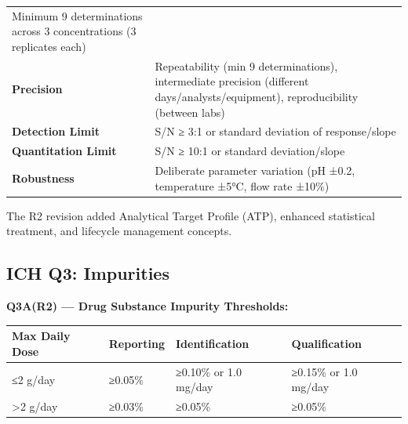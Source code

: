 \documentclass[
  11pt,
  a4paper,
]{report}
\begin{document}
\begin{longtable}[]{@{}ll@{}}
\begin{minipage}[t]{0.51\columnwidth}
Minimum 9 determinations across 3 concentrations (3 replicates
each)\strut
\end{minipage}\tabularnewline
\begin{minipage}[t]{0.43\columnwidth}\raggedright
\textbf{Precision}\strut
\end{minipage} & \begin{minipage}[t]{0.51\columnwidth}\raggedright
Repeatability (min 9 determinations), intermediate precision (different
days/analysts/equipment), reproducibility (between labs)\strut
\end{minipage}\tabularnewline
\begin{minipage}[t]{0.43\columnwidth}\raggedright
\textbf{Detection Limit}\strut
\end{minipage} & \begin{minipage}[t]{0.51\columnwidth}\raggedright
S/N ≥ 3:1 or standard deviation of response/slope\strut
\end{minipage}\tabularnewline
\begin{minipage}[t]{0.43\columnwidth}\raggedright
\textbf{Quantitation Limit}\strut
\end{minipage} & \begin{minipage}[t]{0.51\columnwidth}\raggedright
S/N ≥ 10:1 or standard deviation/slope\strut
\end{minipage}\tabularnewline
\begin{minipage}[t]{0.43\columnwidth}\raggedright
\textbf{Robustness}\strut
\end{minipage} & \begin{minipage}[t]{0.51\columnwidth}\raggedright
Deliberate parameter variation (pH ±0.2, temperature ±5°C, flow rate
±10\%)\strut
\end{minipage}\tabularnewline
\bottomrule
\end{longtable}

The R2 revision added Analytical Target Profile (ATP), enhanced
statistical treatment, and lifecycle management concepts.

\hypertarget{ich-q3-impurities}{%
\subsection{ICH Q3: Impurities}\label{ich-q3-impurities}}

\textbf{Q3A(R2) --- Drug Substance Impurity Thresholds:}

\begin{longtable}[]{@{}llll@{}}
\toprule
Max Daily Dose & Reporting & Identification &
Qualification\tabularnewline
\midrule
\endhead
≤2 g/day & ≥0.05\% & ≥0.10\% or 1.0 mg/day & ≥0.15\% or 1.0
mg/day\tabularnewline
\textgreater2 g/day & ≥0.03\% & ≥0.05\% & ≥0.05\%\tabularnewline
\bottomrule
\end{longtable}
\end{document}
